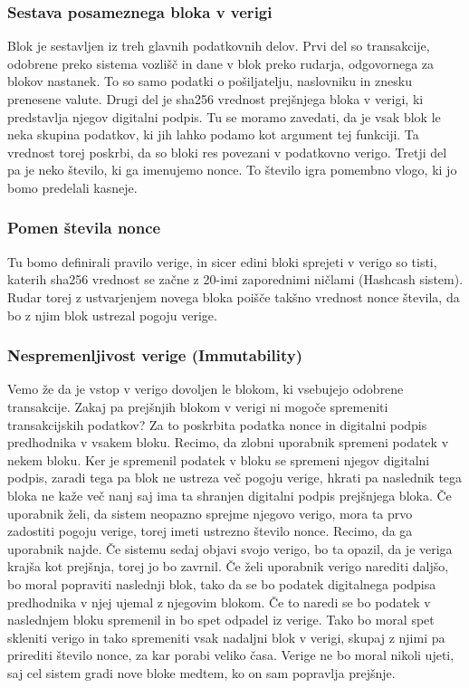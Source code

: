 \documentclass[letterpaper, titlepage, freqn]{article}
\begin{document}
\subsubsection{Sestava posameznega bloka v verigi}

Blok je sestavljen iz treh glavnih podatkovnih delov.
Prvi del so transakcije, odobrene preko sistema vozlišč in dane v blok preko rudarja, odgovornega za blokov nastanek. To so samo podatki o pošiljatelju, naslovniku in znesku prenesene valute.
Drugi del je sha256 vrednost prejšnjega bloka v verigi, ki predstavlja njegov digitalni podpis. Tu se moramo zavedati, da je vsak blok le neka skupina podatkov, ki jih lahko podamo kot argument tej funkciji. Ta vrednost torej poskrbi, da so bloki res povezani v podatkovno verigo.
Tretji del pa je neko število, ki ga imenujemo nonce. To število igra pomembno vlogo, ki jo bomo predelali kasneje.\\
 
 
\subsubsection{Pomen števila nonce}

Tu bomo definirali pravilo verige, in sicer edini bloki sprejeti v verigo so tisti, katerih sha256 vrednost se začne z 20-imi zaporednimi ničlami (Hashcash sistem). Rudar torej z ustvarjenjem novega bloka poišče takšno vrednost nonce števila, da bo z njim blok ustrezal pogoju verige.\\
 
\subsubsection{Nespremenljivost verige (Immutability)}

Vemo že da je vstop v verigo dovoljen le blokom, ki vsebujejo odobrene transakcije. Zakaj pa prejšnjih blokom v verigi ni mogoče spremeniti transakcijskih podatkov? Za to poskrbita podatka nonce in digitalni podpis predhodnika v vsakem bloku. Recimo, da zlobni uporabnik spremeni podatek v nekem bloku. Ker je spremenil podatek v bloku se spremeni njegov digitalni podpis, zaradi tega pa blok ne ustreza več pogoju verige, hkrati pa naslednik tega bloka ne kaže več nanj saj ima ta shranjen digitalni podpis prejšnjega bloka. Če uporabnik želi, da sistem neopazno sprejme njegovo verigo, mora ta prvo zadostiti pogoju verige, torej imeti ustrezno število nonce. Recimo, da ga uporabnik najde. Če sistemu sedaj objavi svojo verigo, bo ta opazil, da je veriga krajša kot prejšnja, torej jo bo zavrnil. Če želi uporabnik verigo narediti daljšo, bo moral popraviti naslednji blok, tako da se bo podatek digitalnega podpisa predhodnika v njej ujemal z njegovim blokom. Če to naredi se bo podatek v naslednjem bloku spremenil in bo spet odpadel iz verige. Tako bo moral spet skleniti verigo in tako spremeniti vsak nadaljni blok v verigi, skupaj z njimi pa prirediti število nonce, za kar porabi veliko časa. Verige ne bo moral nikoli ujeti, saj cel sistem gradi nove bloke medtem, ko on sam popravlja prejšnje.\\
 
\end{document}
